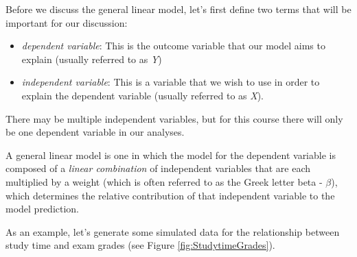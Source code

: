 \documentclass[]{book}
\newenvironment{Shaded}{\begin{snugshade}}{\end{snugshade}}
\newcommand{\KeywordTok}[1]{\textcolor[rgb]{0.13,0.29,0.53}{\textbf{#1}}}
\newcommand{\DataTypeTok}[1]{\textcolor[rgb]{0.13,0.29,0.53}{#1}}
\newcommand{\DecValTok}[1]{\textcolor[rgb]{0.00,0.00,0.81}{#1}}
\newcommand{\StringTok}[1]{\textcolor[rgb]{0.31,0.60,0.02}{#1}}
\newcommand{\CommentTok}[1]{\textcolor[rgb]{0.56,0.35,0.01}{\textit{#1}}}
\newcommand{\OperatorTok}[1]{\textcolor[rgb]{0.81,0.36,0.00}{\textbf{#1}}}
\newcommand{\NormalTok}[1]{#1}
\providecommand{\tightlist}{%
  \setlength{\itemsep}{0pt}\setlength{\parskip}{0pt}}
\theoremstyle{definition}
\theoremstyle{definition}
\theoremstyle{definition}
\theoremstyle{remark}
\begin{document}
Before we discuss the general linear model, let's first define two terms
that will be important for our discussion:

\begin{itemize}
\tightlist
\item
  \emph{dependent variable}: This is the outcome variable that our model
  aims to explain (usually referred to as \emph{Y})
\item
  \emph{independent variable}: This is a variable that we wish to use in
  order to explain the dependent variable (usually referred to as
  \emph{X}).
\end{itemize}

There may be multiple independent variables, but for this course there
will only be one dependent variable in our analyses.

A general linear model is one in which the model for the dependent
variable is composed of a \emph{linear combination} of independent
variables that are each multiplied by a weight (which is often referred
to as the Greek letter beta - \(\beta\)), which determines the relative
contribution of that independent variable to the model prediction.

As an example, let's generate some simulated data for the relationship
between study time and exam grades (see Figure
\ref{fig:StudytimeGrades}).

\begin{Shaded}
\end{Shaded}
\end{document}

